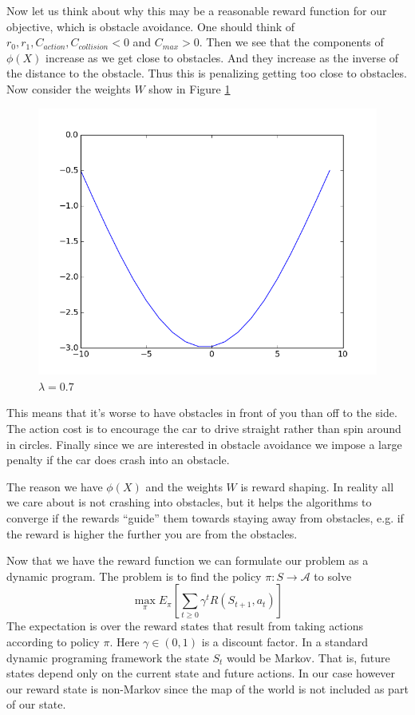 \documentclass{article}
\begin{document}
Now let us think about why this may be a reasonable reward function for our objective, which is obstacle avoidance. One should think of $r_0,r_1, C_{action}, C_{collision} < 0$ and $C_{max} > 0$. Then we see that the components of $\phi(X)$ increase as we get close to obstacles. And they increase as the inverse of the distance to the obstacle. Thus this is penalizing getting too close to obstacles. Now consider the weights $W$ show in Figure \ref{figures/raycastRewardWeights.png}
%
%
\begin{figure}
\centering
\includegraphics[scale=0.5]{figures/raycastRewardWeights.png}
\caption{$\lambda = 0.7$}
\label{figures/raycastRewardWeights.png}
\end{figure}
%
%
%
 This means that it's worse to have obstacles in front of you than off to the side. The action cost is to encourage the car to drive straight rather than spin around in circles. Finally since we are interested in obstacle avoidance we impose a large penalty if the car does crash into an obstacle.

The reason we have $\phi(X)$ and the weights $W$ is reward shaping. In reality all we care about is not crashing into obstacles, but it helps the algorithms to converge if the rewards ``guide'' them towards staying away from obstacles, e.g. if the reward is higher the further you are from the obstacles. 

Now that we have the reward function we can formulate our problem as a dynamic program. The problem is to find the policy $\pi:S \to \mathcal{A}$ to solve
%
%
\begin{equation}
\max_{\pi} E_{\pi} \left[ \sum_{t \geq 0} \gamma^t R(S_{t+1}, a_t) \right]
\end{equation}
%
%
The expectation is over the reward states that result from taking actions according to policy $\pi$. Here $\gamma \in (0,1)$ is a discount factor. In a standard dynamic programing framework the state $S_t$ would be Markov. That is, future states depend only on the current state and future actions. In our case however our reward state is non-Markov since the map of the world is not included as part of our state. 
\end{document}

